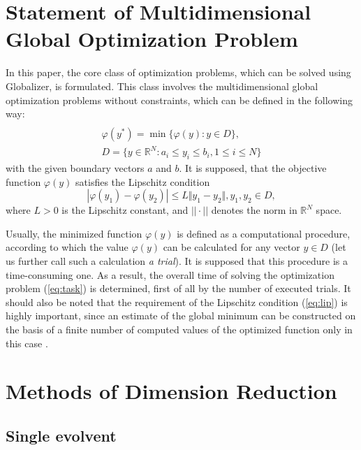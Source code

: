\documentclass[runningheads]{llncs}
\begin{document}
\section{Statement of Multidimensional Global Optimization Problem}
In this paper, the core class of optimization problems, which can be solved using
Globalizer, is formulated. This class involves the multidimensional global
optimization problems without constraints, which can be defined in the following way:
\begin{equation}
\label{eq:task}
\begin{array}{cr}\\
  \varphi(y^*)=\min\{\varphi(y):y\in D\}, \\
  D=\{y\in \mathbb{R}^N:a_i\leq y_i\leq{b_i}, 1\leq{i}\leq{N}\}
\end{array}
\end{equation}
with the given boundary vectors  $a$ and  $b$. It is supposed, that the objective function \(\varphi(y)\) satisfies the Lipschitz condition
\begin{equation}
\label{eq:lip}
|\varphi(y_1)-\varphi(y_2)|\leq L\Vert y_1-y_2\Vert,y_1,y_2\in D,
\end{equation}
where \(L>0\) is the Lipschitz constant, and \(||\cdot||\) denotes the norm in \(\mathbb{R}^N\) space.
\par
Usually, the minimized function \(\varphi(y)\) is defined as a computational procedure,
according to which the value \(\varphi(y)\) can be calculated for any vector \(y\in D\)
(let us further call such a calculation \textit{a trial}). It is supposed that this procedure
is a time-consuming one. As a result, the overall time of solving the optimization
problem (\ref{eq:task}) is determined, first of all by the number of executed trials.
It should also be noted that the requirement of the Lipschitz condition (\ref{eq:lip})
is highly important, since an estimate of the global minimum can be constructed on the
basis of a finite number of computed values of the optimized function only in this case .

\section{Methods of Dimension Reduction}
\subsection{Single evolvent}
\end{document}
